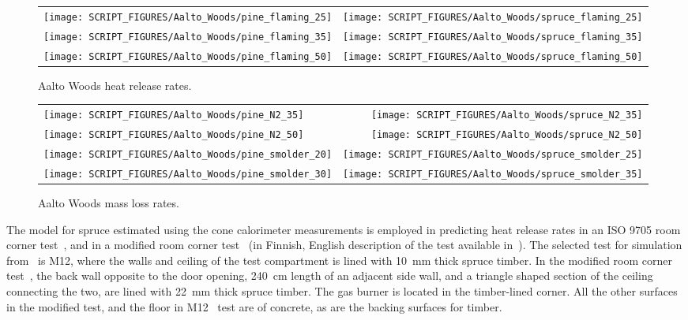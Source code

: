 \begin{figure}[!h]
\begin{tabular*}{\textwidth}{l@{\extracolsep{\fill}}r}
\texttt{[image: SCRIPT\_FIGURES/Aalto\_Woods/pine\_flaming\_25]} &
\texttt{[image: SCRIPT\_FIGURES/Aalto\_Woods/spruce\_flaming\_25]} \\
\texttt{[image: SCRIPT\_FIGURES/Aalto\_Woods/pine\_flaming\_35]} &
\texttt{[image: SCRIPT\_FIGURES/Aalto\_Woods/spruce\_flaming\_35]} \\
\texttt{[image: SCRIPT\_FIGURES/Aalto\_Woods/pine\_flaming\_50]} &
\texttt{[image: SCRIPT\_FIGURES/Aalto\_Woods/spruce\_flaming\_50]} \\
\end{tabular*}
\caption[Aalto Woods heat release rates]{Aalto Woods heat release rates.}
\label{Aalto_Woods_HRR}
\end{figure}

\FloatBarrier

\begin{figure}[p]
\begin{tabular*}{\textwidth}{l@{\extracolsep{\fill}}r}
\texttt{[image: SCRIPT\_FIGURES/Aalto\_Woods/pine\_N2\_35]} &
\texttt{[image: SCRIPT\_FIGURES/Aalto\_Woods/spruce\_N2\_35]} \\
\texttt{[image: SCRIPT\_FIGURES/Aalto\_Woods/pine\_N2\_50]} &
\texttt{[image: SCRIPT\_FIGURES/Aalto\_Woods/spruce\_N2\_50]} \\
\texttt{[image: SCRIPT\_FIGURES/Aalto\_Woods/pine\_smolder\_20]} &
\texttt{[image: SCRIPT\_FIGURES/Aalto\_Woods/spruce\_smolder\_25]} \\
\texttt{[image: SCRIPT\_FIGURES/Aalto\_Woods/pine\_smolder\_30]} &
\texttt{[image: SCRIPT\_FIGURES/Aalto\_Woods/spruce\_smolder\_35]}
\end{tabular*}
\caption[Aalto Woods mass loss rates]{Aalto Woods mass loss rates.}
\label{Aalto_Woods_MLR}
\end{figure}

\FloatBarrier

The model for spruce estimated using the cone calorimeter measurements is employed in predicting heat release rates in an ISO 9705 room corner test~\cite{Sundstrom:1998}, and in a modified room corner test~\cite{Hietaniemi:2001} (in Finnish, English description of the test available in~\cite{Hietaniemi:1}). The selected test for simulation from~\cite{Sundstrom:1998} is M12, where the walls and ceiling of the test compartment is lined with 10~mm thick spruce timber. In the modified room corner test~\cite{Hietaniemi:2001}, the back wall opposite to the door opening, 240~cm length of an adjacent side wall, and a triangle shaped section of the ceiling connecting the two, are lined with 22~mm thick spruce timber. The gas burner is located in the timber-lined corner. All the other surfaces in the modified test, and the floor in M12~\cite{Sundstrom:1998} test are of concrete, as are the backing surfaces for timber.

